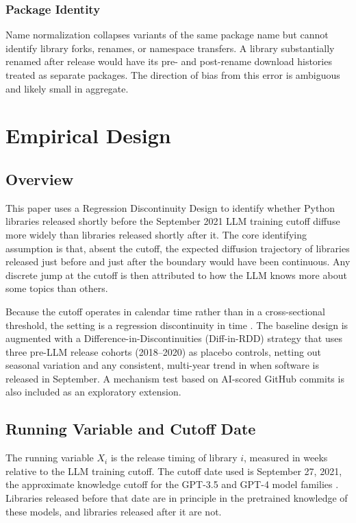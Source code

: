 \documentclass[12pt, a4paper]{report}
\begin{document}
\subsection{Package Identity}
Name normalization collapses variants of the same package name but cannot identify library forks, renames, or namespace transfers. A library substantially renamed after release would have its pre- and post-rename download histories treated as separate packages. The direction of bias from this error is ambiguous and likely small in aggregate.

\chapter{Empirical Design}\label{ch:methods}

\section{Overview}\label{sec:methods-overview}
This paper uses a Regression Discontinuity Design \citep[RDD;][]{imbens2008regression, lee2010regression, cattaneo2020practical, cattaneo2022regression} to identify whether Python libraries released shortly before the September 2021 LLM training cutoff diffuse more widely than libraries released shortly after it. The core identifying assumption is that, absent the cutoff, the expected diffusion trajectory of libraries released just before and just after the boundary would have been continuous. Any discrete jump at the cutoff is then attributed to how the LLM knows more about some topics than others.

Because the cutoff operates in calendar time rather than in a cross-sectional threshold, the setting is a regression discontinuity in time \citep{hausman2018regression}. The baseline design is augmented with a Difference-in-Discontinuities (Diff-in-RDD) strategy \citep{grembi2016fiscal, shinoki2024difference} that uses three pre-LLM release cohorts (2018--2020) as placebo controls, netting out seasonal variation and any consistent, multi-year trend in when software is released in September. A mechanism test based on AI-scored GitHub commits is also included as an exploratory extension.

\section{Running Variable and Cutoff Date}\label{sec:methods-running}
The running variable $X_i$ is the release timing of library $i$, measured in weeks relative to the LLM training cutoff. The cutoff date used is September 27, 2021, the approximate knowledge cutoff for the GPT-3.5 and GPT-4 model families \citep{openai2023gpt4}. Libraries released before that date are in principle in the pretrained knowledge of these models, and libraries released after it are not.
\end{document}
